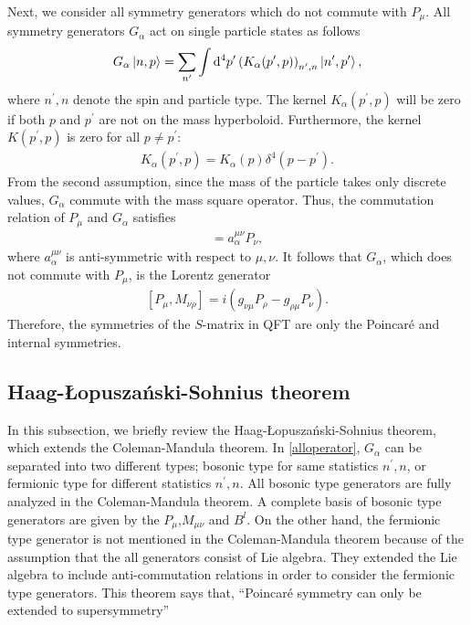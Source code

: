 \documentclass[a4paper,12pt]{article}
\def\Z{\mathbb{Z}}
\def\ua{\alpha}
\theoremstyle{plain}
\theoremstyle{definition}
\begin{document}
Next, we consider all symmetry generators which do not commute with $P_\mu$.
All symmetry generators $G_{\ua}$ act on single particle states as follows
\begin{align} \label{alloperator}
G_\alpha \ket{n ,p}= \sum_{n^\prime} \int \dd^4 p^{\prime} \left( K_\alpha(p^{\prime}, p) \right)_{n^{\prime}, n}\ket{n^\prime ,p^\prime} ,
\end{align}
where $n^{\prime}, n$ denote the spin and particle type.
The kernel $K_\alpha (p^{\prime}, p)$ will be zero if both $p$ and $p^{\prime} $ are not on the mass hyperboloid. 
Furthermore, the kernel $K(p^{\prime}, p)$ is zero for all $p \neq p^\prime$:
\begin{align}
K_\alpha(p^{\prime}, p) = K_\alpha(p) \delta^4(p-p^{\prime}) .
\end{align}
From the second assumption, since the mass of the particle takes only discrete values, $G_\alpha$ commute with the mass square operator.
Thus, the commutation relation of $P_\mu$ and $G_\alpha$ satisfies
\begin{align}
[P^\mu,G_\alpha]=a_\alpha^{\mu\nu}P_\nu,
\end{align}
where $a_\alpha^{\mu \nu}$ is anti-symmetric with respect to $\mu,\nu$.
It follows that $G_\alpha$, which does not commute with $P_\mu$, is the Lorentz generator 
\begin{align}\label{Poincare}
[P_\mu, M_{\nu\rho}]=i(g_{\nu\mu}P_\rho - g_{\rho \mu}P_\nu).
\end{align}
Therefore, the symmetries of the $S$-matrix in QFT are only the Poincar\'e and internal symmetries.


\subsection{Haag-\L opusza\'nski-Sohnius theorem}
In this subsection, we briefly review the Haag-\L opusza\'nski-Sohnius theorem\cite{HLS}, which extends the Coleman-Mandula theorem.
In \eqref{alloperator}, $G_\alpha$ can be separated into two different types; bosonic type for same statistics $n^{\prime}, n$, or fermionic type for different statistics $n^{\prime}, n$.
All bosonic type generators are fully analyzed in the Coleman-Mandula theorem.
A complete basis of bosonic type generators are given by the $P_{\mu}$,$M_{\mu\nu}$ and  $B^l$.
On the other hand, the fermionic type generator is not mentioned in the Coleman-Mandula theorem because of the assumption that the all generators consist of Lie algebra.
They extended the Lie algebra to include anti-commutation relations in order to consider the fermionic type generators.
This theorem says that,
``Poincar\'e symmetry can only be extended to supersymmetry''
\end{document}
